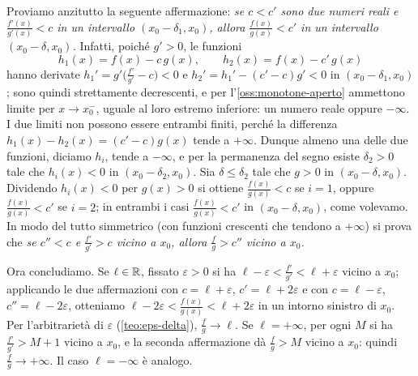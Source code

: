 \begin{dimostrazione}
Proviamo anzitutto la seguente affermazione: \emph{se $c<c'$ sono due numeri reali e
$\frac{f'(x)}{g'(x)}<c$ in un intervallo $(x_{0}-\delta_{1},x_{0})$, allora
$\frac{f(x)}{g(x)}<c'$ in un intervallo $(x_{0}-\delta,x_{0})$.} Infatti, poiché $g'>0$,
le funzioni
\[
  h_{1}(x)=f(x)-c\,g(x), \qquad h_{2}(x)=f(x)-c'\,g(x)
\]
hanno derivate $h_{1}'=g'\bigl(\frac{f'}{g'}-c\bigr)<0$ e
$h_{2}'=h_{1}'-(c'-c)g'<0$ in $(x_{0}-\delta_{1},x_{0})$; sono quindi strettamente
decrescenti, e per l'\cref{oss:monotone-aperto} ammettono limite per
$x\to x_{0}^{-}$, uguale al loro estremo inferiore: un numero reale oppure $-\infty$. I due
limiti non possono essere entrambi finiti, perché la differenza
$h_{1}(x)-h_{2}(x)=(c'-c)g(x)$ tende a $+\infty$. Dunque almeno una delle due funzioni,
diciamo $h_{i}$, tende a $-\infty$, e per la permanenza del segno esiste $\delta_{2}>0$
tale che $h_{i}(x)<0$ in $(x_{0}-\delta_{2},x_{0})$. Sia $\delta\le\delta_{2}$ tale che
$g>0$ in $(x_{0}-\delta,x_{0})$. Dividendo $h_{i}(x)<0$ per $g(x)>0$ si ottiene
$\frac{f(x)}{g(x)}<c$ se $i=1$, oppure $\frac{f(x)}{g(x)}<c'$ se $i=2$; in entrambi i casi
$\frac{f(x)}{g(x)}<c'$ in $(x_{0}-\delta,x_{0})$, come volevamo. In modo del tutto
simmetrico (con funzioni crescenti che tendono a $+\infty$) si prova che \emph{se
$c''<c$ e $\frac{f'}{g'}>c$ vicino a $x_{0}$, allora $\frac fg>c''$ vicino a $x_{0}$.}

Ora concludiamo. Se $\ell\in\mathbb{R}$, fissato $\varepsilon>0$ si ha
$\ell-\varepsilon<\frac{f'}{g'}<\ell+\varepsilon$ vicino a $x_{0}$; applicando le due
affermazioni con $c=\ell+\varepsilon$, $c'=\ell+2\varepsilon$ e con $c=\ell-\varepsilon$,
$c''=\ell-2\varepsilon$, otteniamo $\ell-2\varepsilon<\frac{f(x)}{g(x)}<\ell+2\varepsilon$ in un
intorno sinistro di $x_{0}$. Per l'arbitrarietà di $\varepsilon$ (\cref{teo:eps-delta}),
$\frac fg\to\ell$. Se $\ell=+\infty$, per ogni $M$ si ha $\frac{f'}{g'}>M+1$ vicino a
$x_{0}$, e la seconda affermazione dà $\frac fg>M$ vicino a $x_{0}$: quindi
$\frac fg\to+\infty$. Il caso $\ell=-\infty$ è analogo.


\end{dimostrazione}
